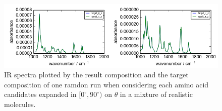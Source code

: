 
\begin{figure}[!ht] 
\centering
\includegraphics[scale=0.7]{Figures/chapter5_result_target_residual_plotting__ir_result8_run1.png}
\caption{IR spectra plotted by the result composition and the target composition of one ramdon run when considering each amino acid candidates expanded in $[0^{\circ}, 90^{\circ})$ on $\theta$ in a mixture of realistic molecules.} \label{fig:5.1}
\end{figure}

